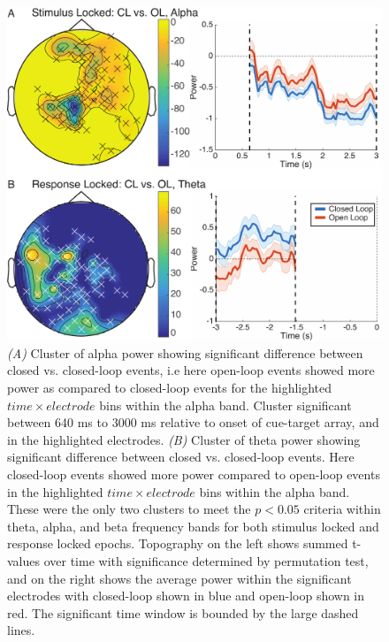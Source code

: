 \documentclass[11pt, titlepage, twoside]{article}
\providecommand{\DIFaddend}{} %
\begin{document}
\DIFaddend \begin{figure}
	\begin{center}
		\includegraphics[width=.9\textwidth]{figs/deevPowerClusters_edit.pdf}
	\end{center}
	\caption[Closed vs. Open Loop EEG Clusters]{
		\emph{(A)} Cluster of alpha power showing significant difference between closed vs. closed-loop events, i.e here open-loop events showed more power as compared to closed-loop events for the highlighted $time \times electrode$ bins within the alpha band.  Cluster significant between 640 ms to 3000 ms relative to onset of cue-target array, and in the highlighted electrodes.
		\emph{(B)} Cluster of theta power showing significant difference between closed vs. closed-loop events.  Here closed-loop events showed more power compared to open-loop events in the highlighted $time \times electrode$ bins within the alpha band.  These were the only two clusters to meet the $p<0.05$ criteria within theta, alpha, and beta frequency bands for both stimulus locked and response locked epochs.  Topography on the left shows summed t-values over time with significance determined by permutation test, and on the right shows the average power within the significant electrodes with closed-loop shown in blue and open-loop shown in red.  The significant time window is bounded by the large dashed lines.
	}
	\label{fig:deevPowerClusters}
\end{figure}
\end{document}

